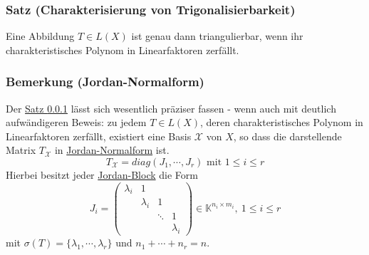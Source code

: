 \subsubsection{Satz (Charakterisierung von Trigonalisierbarkeit)}
\label{4.4.5}
Eine Abbildung $T\in L(X)$ ist genau dann triangulierbar, wenn ihr charakteristisches Polynom in Linearfaktoren zerfällt.
\subsubsection{Bemerkung (Jordan-Normalform)}
Der \hyperref[4.4.5]{Satz \ref{4.4.5}} lässt sich wesentlich präziser fassen - wenn auch mit deutlich aufwändigeren Beweis: zu jedem $T\in L(X)$, deren charakteristisches Polynom in Linearfaktoren zerfällt, existiert eine Basis $\mathcal{X}$ von $X$, so dass die darstellende Matrix $T_\mathcal{X}$ in \underline{Jordan-Normalform} ist.
\[T_\mathcal{X}=diag(J_1,\cdots ,J_r)\text{ mit } 1\leq i\leq r\]
Hierbei besitzt jeder \underline{Jordan-Block} die Form 
\[J_i=\begin{pmatrix}\lambda _i & 1\\ & \lambda _i & 1 \\& & \ddots & 1\\ & & & \lambda _i\end{pmatrix}\in\mathbb{K}^{n_i\times m_i},\ 1\leq i\leq r\]
mit $\sigma (T) = \{\lambda _1,\cdots ,\lambda _r\}$ und $n_1+\cdots +n_r=n$.
